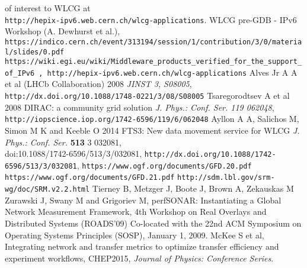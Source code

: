 \begin{thebibliography}{1}
of interest to WLCG at\\ {\tt http://hepix-ipv6.web.cern.ch/wlcg-applications}.
 WLCG pre-GDB - IPv6 Workshop (A. Dewhurst et al.), \\ {\tt https://indico.cern.ch/event/313194/session/1/contribution/3/0/material/slides/0.pdf}
  { \tt https://wiki.egi.eu/wiki/Middleware\_products\_verified\_for\_the\_support\_of\_IPv6 , http://hepix-ipv6.web.cern.ch/wlcg-applications}
 {Alves Jr A A et al (LHCb Collaboration)} 2008 {\it JINST 3, S08005}, \\ {\tt http://dx.doi.org/10.1088/1748-0221/3/08/S08005}
  Tsaregorodtsev A et al 2008 DIRAC: a community grid solution {\it J. Phys.: Conf. Ser. 119 062048}, {\tt http://iopscience.iop.org/1742-6596/119/6/062048}
 {Ayllon A A, Salichos M, Simon M K and Keeble O} 2014 {FTS3: New data movement service for WLCG} {\it J. Phys.: Conf. Ser.}  {\bf 513} 3 032081, \\  doi:{10.1088/1742-6596/513/3/032081}, {\tt{http://dx.doi.org/10.1088/1742-6596/513/3/032081}},
 {\tt https://www.ogf.org/documents/GFD.20.pdf} 
 {\tt https://www.ogf.org/documents/GFD.21.pdf} 
 {\tt http://sdm.lbl.gov/srm-wg/doc/SRM.v2.2.html}
 Tierney B, Metzger J, Boote J, Brown A, Zekauskas M
Zurawski J, Swany M and Grigoriev M, perfSONAR: Instantiating a
Global Network Measurement Framework, 4th Workshop on Real Overlays and
Distributed Systems (ROADS’09) Co-located with the 22nd ACM Symposium
on Operating Systems Principles (SOSP), January 1, 2009.
 McKee S et al, Integrating network and
transfer metrics to optimize transfer efficiency and experiment workflows,
CHEP2015, {\it Journal of Physics: Conference Series}.



\end{thebibliography}





